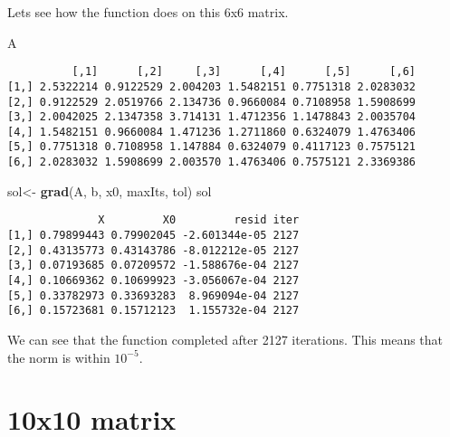 \documentclass[]{article}
\newenvironment{Shaded}{\begin{snugshade}}{\end{snugshade}}
\newcommand{\KeywordTok}[1]{\textcolor[rgb]{0.13,0.29,0.53}{\textbf{#1}}}
\newcommand{\StringTok}[1]{\textcolor[rgb]{0.31,0.60,0.02}{#1}}
\newcommand{\NormalTok}[1]{#1}
\begin{document}
Lets see how the function does on this 6x6 matrix.

\begin{Shaded}
\begin{Highlighting}[]
\NormalTok{A}
\end{Highlighting}
\end{Shaded}

\begin{verbatim}
          [,1]      [,2]     [,3]      [,4]      [,5]      [,6]
[1,] 2.5322214 0.9122529 2.004203 1.5482151 0.7751318 2.0283032
[2,] 0.9122529 2.0519766 2.134736 0.9660084 0.7108958 1.5908699
[3,] 2.0042025 2.1347358 3.714131 1.4712356 1.1478843 2.0035704
[4,] 1.5482151 0.9660084 1.471236 1.2711860 0.6324079 1.4763406
[5,] 0.7751318 0.7108958 1.147884 0.6324079 0.4117123 0.7575121
[6,] 2.0283032 1.5908699 2.003570 1.4763406 0.7575121 2.3369386
\end{verbatim}

\begin{Shaded}
\begin{Highlighting}[]
\NormalTok{sol<-}\StringTok{ }\KeywordTok{grad}\NormalTok{(A, b, x0, maxIts, tol)}
\NormalTok{sol}
\end{Highlighting}
\end{Shaded}

\begin{verbatim}
              X         X0         resid iter
[1,] 0.79899443 0.79902045 -2.601344e-05 2127
[2,] 0.43135773 0.43143786 -8.012212e-05 2127
[3,] 0.07193685 0.07209572 -1.588676e-04 2127
[4,] 0.10669362 0.10699923 -3.056067e-04 2127
[5,] 0.33782973 0.33693283  8.969094e-04 2127
[6,] 0.15723681 0.15712123  1.155732e-04 2127
\end{verbatim}

We can see that the function completed after 2127 iterations. This means
that the norm is within \(10^{-5}\).

\section{10x10 matrix}\label{x10-matrix}
\end{document}
